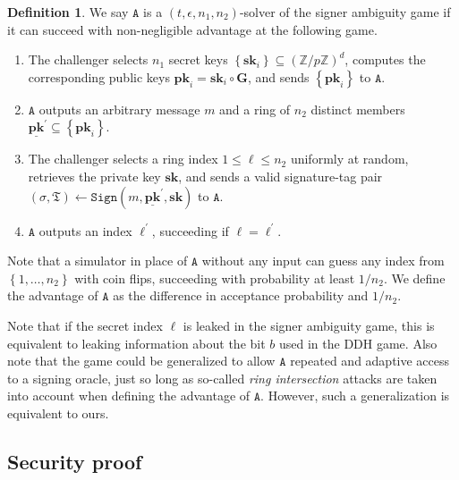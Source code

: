 \documentclass{mrl}
\theoremstyle{plain}
\theoremstyle{definition}
\newtheorem{defn}{Definition}[section]
\begin{document}
\begin{defn}\label{sigambgame} We say $\texttt{A}$ is a $(t,\epsilon,n_1,n_2)$-solver of the signer ambiguity game if it can succeed with non-negligible advantage at the following game.
\begin{enumerate}
\item The challenger selects $n_1$ secret keys $\left\{\textbf{sk}_i\right\} \subseteq (\mathbb{Z}/p\mathbb{Z})^d$, computes the corresponding public keys $\textbf{pk}_i = \textbf{sk}_i \circ \textbf{G}$, and sends $\left\{\textbf{pk}_i\right\}$ to $\texttt{A}$.

\item $\texttt{A}$ outputs an arbitrary message $m$ and a ring of $n_2$ distinct members $\underline{\textbf{pk}}^\prime \subseteq \left\{\textbf{pk}_i\right\}$.

\item The challenger selects a ring index $1 \leq \ell \leq n_2$ uniformly at random, retrieves the private key $\textbf{sk}$, and sends a valid signature-tag pair $(\sigma, \mathfrak{T}) \leftarrow \texttt{Sign}(m, \underline{\textbf{pk}}^\prime, \textbf{sk})$ to $\texttt{A}$.
\item $\texttt{A}$ outputs an index $\ell^\prime$, succeeding if $\ell = \ell^\prime$. 
\end{enumerate}
Note that a simulator in place of $\texttt{A}$ without any input can guess any index from $\left\{1, \ldots, n_2\right\}$ with coin flips, succeeding with probability  at least $1/n_2$. We define the advantage of $\texttt{A}$ as the difference in acceptance probability and $1/n_2$.
\end{defn}

Note that if the secret index $\ell$ is leaked in the signer ambiguity game, this is equivalent to leaking information about the bit $b$ used in the DDH game. Also note that the game could be generalized to allow $\texttt{A}$ repeated and adaptive access to a signing oracle, just so long as so-called \textit{ring intersection} attacks are taken into account when defining the advantage of $\texttt{A}$. However, such a generalization is equivalent to ours.

\subsection{Security proof}
\end{document}
